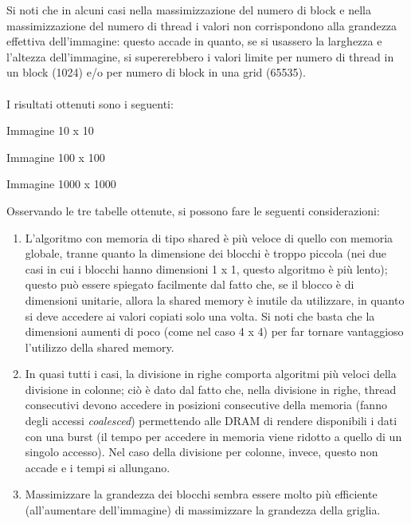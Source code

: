 \documentclass[10pt,twocolumn,letterpaper]{article}
\begin{document}
Si noti che in alcuni casi nella massimizzazione del numero di block e nella massimizzazione del numero di thread i valori non corrispondono alla grandezza effettiva dell'immagine: questo accade in quanto, se si usassero la larghezza e l'altezza dell'immagine, si supererebbero i valori limite per numero di thread in un block (1024) e/o per numero di block in una grid (65535).\\
\\
I risultati ottenuti sono i seguenti:

\begin{table}[H]
\caption{Immagine 10 x 10}
\end{table}
\begin{table}[H]
\caption{Immagine 100 x 100}
\end{table}
\begin{table}[H]
\caption{Immagine 1000 x 1000}
\end{table}
Osservando le tre tabelle ottenute, si possono fare le seguenti considerazioni:
\begin{enumerate}
\item{L'algoritmo con memoria di tipo shared è più veloce di quello con memoria globale, tranne quanto la dimensione dei blocchi è troppo piccola (nei due casi in cui i blocchi hanno dimensioni 1 x 1, questo algoritmo è più lento); questo può essere spiegato facilmente dal fatto che, se il blocco è di dimensioni unitarie, allora la shared memory è inutile da utilizzare, in quanto si deve accedere ai valori copiati solo una volta. Si noti che basta che la dimensioni aumenti di poco (come nel caso 4 x 4) per far tornare vantaggioso l'utilizzo della shared memory.}
\item{In quasi tutti i casi, la divisione in righe comporta algoritmi più veloci della divisione in colonne; ciò è dato dal fatto che, nella divisione in righe, thread consecutivi devono accedere in posizioni consecutive della memoria (fanno degli accessi \textit{coalesced}) permettendo alle DRAM di rendere disponibili i dati con una burst (il tempo per accedere in memoria viene ridotto a quello di un singolo accesso). Nel caso della divisione per colonne, invece, questo non accade e i tempi si allungano.}
\item{Massimizzare la grandezza dei blocchi sembra essere molto più efficiente (all'aumentare dell'immagine) di massimizzare la grandezza della griglia.}
\end{enumerate}
\end{document}

